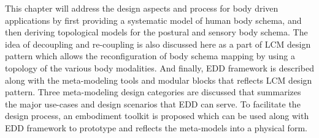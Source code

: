 This chapter will address the design aspects and process for body driven applications by first providing a systematic model of human body schema, and then deriving topological models for the postural and sensory body schema. The idea of decoupling and re-coupling is also discussed here as a part of LCM design pattern which allows the reconfiguration of body schema mapping by using a topology of the various body modalities. And finally, EDD framework is described along with the meta-modeling tools and modular blocks that reflects LCM design pattern. Three meta-modeling design categories are discussed that summarizes the major use-cases and design scenarios that EDD can serve. To facilitate the design process, an embodiment toolkit is proposed which can be used along with EDD framework to prototype and reflects the meta-models into a physical form.

